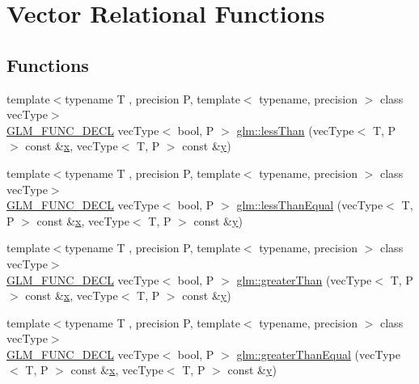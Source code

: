 \hypertarget{group__core__func__vector__relational}{}\section{Vector Relational Functions}
\label{group__core__func__vector__relational}
\subsection*{Functions}
\begin{DoxyCompactItemize}
\item 
{\footnotesize template$<$typename T , precision P, template$<$ typename, precision $>$ class vec\+Type$>$ }\\\mbox{\hyperlink{setup_8hpp_ab2d052de21a70539923e9bcbf6e83a51}{G\+L\+M\+\_\+\+F\+U\+N\+C\+\_\+\+D\+E\+CL}} vec\+Type$<$ bool, P $>$ \mbox{\hyperlink{group__core__func__vector__relational_ga6261970937a70b0b747ae0d3ade1c188}{glm\+::less\+Than}} (vec\+Type$<$ T, P $>$ const \&\mbox{\hyperlink{glad_8h_a92d0386e5c19fb81ea88c9f99644ab1d}{x}}, vec\+Type$<$ T, P $>$ const \&\mbox{\hyperlink{glad_8h_a66ddd433d2cacfe27f5906b7e86faeed}{y}})
\item 
{\footnotesize template$<$typename T , precision P, template$<$ typename, precision $>$ class vec\+Type$>$ }\\\mbox{\hyperlink{setup_8hpp_ab2d052de21a70539923e9bcbf6e83a51}{G\+L\+M\+\_\+\+F\+U\+N\+C\+\_\+\+D\+E\+CL}} vec\+Type$<$ bool, P $>$ \mbox{\hyperlink{group__core__func__vector__relational_gaaf1d88119f11200c32011de7c5ec0102}{glm\+::less\+Than\+Equal}} (vec\+Type$<$ T, P $>$ const \&\mbox{\hyperlink{glad_8h_a92d0386e5c19fb81ea88c9f99644ab1d}{x}}, vec\+Type$<$ T, P $>$ const \&\mbox{\hyperlink{glad_8h_a66ddd433d2cacfe27f5906b7e86faeed}{y}})
\item 
{\footnotesize template$<$typename T , precision P, template$<$ typename, precision $>$ class vec\+Type$>$ }\\\mbox{\hyperlink{setup_8hpp_ab2d052de21a70539923e9bcbf6e83a51}{G\+L\+M\+\_\+\+F\+U\+N\+C\+\_\+\+D\+E\+CL}} vec\+Type$<$ bool, P $>$ \mbox{\hyperlink{group__core__func__vector__relational_gadd80263161a308462d3e3e287e79cccd}{glm\+::greater\+Than}} (vec\+Type$<$ T, P $>$ const \&\mbox{\hyperlink{glad_8h_a92d0386e5c19fb81ea88c9f99644ab1d}{x}}, vec\+Type$<$ T, P $>$ const \&\mbox{\hyperlink{glad_8h_a66ddd433d2cacfe27f5906b7e86faeed}{y}})
\item 
{\footnotesize template$<$typename T , precision P, template$<$ typename, precision $>$ class vec\+Type$>$ }\\\mbox{\hyperlink{setup_8hpp_ab2d052de21a70539923e9bcbf6e83a51}{G\+L\+M\+\_\+\+F\+U\+N\+C\+\_\+\+D\+E\+CL}} vec\+Type$<$ bool, P $>$ \mbox{\hyperlink{group__core__func__vector__relational_gaee7e101f8cc4ea43924f14dcdeb2ef26}{glm\+::greater\+Than\+Equal}} (vec\+Type$<$ T, P $>$ const \&\mbox{\hyperlink{glad_8h_a92d0386e5c19fb81ea88c9f99644ab1d}{x}}, vec\+Type$<$ T, P $>$ const \&\mbox{\hyperlink{glad_8h_a66ddd433d2cacfe27f5906b7e86faeed}{y}})

\end{DoxyCompactItemize}
